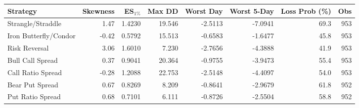 \begin{tabular}{lrrrrrrr}
\toprule
Strategy & Skewness & ES$_{1\%}$ & Max DD & Worst Day & Worst 5-Day & Loss Prob (\%) & Obs \\
\midrule
Strangle/Straddle & 1.47 & 1.4230 & 19.546 & -2.5113 & -7.0941 & 69.3 & 953 \\
Iron Butterfly/Condor & -0.42 & 0.5792 & 15.513 & -0.6583 & -1.6477 & 45.8 & 953 \\
Risk Reversal & 3.06 & 1.6010 & 7.230 & -2.7656 & -4.3888 & 41.9 & 953 \\
Bull Call Spread & 0.37 & 0.9041 & 20.364 & -0.9755 & -3.9473 & 55.4 & 953 \\
Call Ratio Spread & -0.28 & 1.2088 & 22.753 & -2.5148 & -4.4097 & 54.0 & 953 \\
Bear Put Spread & 0.67 & 0.8269 & 8.209 & -0.8641 & -2.9679 & 61.8 & 952 \\
Put Ratio Spread & 0.68 & 0.7101 & 6.111 & -0.8726 & -2.5504 & 58.8 & 952 \\
\bottomrule
\end{tabular}
